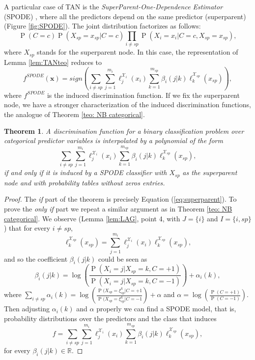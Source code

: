 \documentclass[11pt,a4paper, twoside]{book}
\newtheorem{theorem}{Theorem}[chapter]
\newcommand{\Pp}{\operatorname{P}}
\newcommand{\nchi}{\mathcal{X}}
\begin{document}
A particular case of TAN is the \textit{SuperParent-One-Dependence Estimator} (SPODE) \citep{keogh2002}, where all the predictors depend on the same predictor (superparent) (Figure \ref{fig:SPODE}). The joint distribution factorizes as follows:
\[ \Pp\left(C=c\right)\Pp\left(X_{sp}=x_{sp}|C=c\right)\prod_{i\neq sp} \Pp\left(X_i=x_i|C=c, X_{sp}=x_{sp}\right), \]
where $X_{sp}$ stands for the superparent node.
In this case, the representation of Lemma \ref{lem:TANteo} reduces to
\begin{equation}
\label{eq:superparent}
f^{SPODE}(\mathbf{x})= sign\left(  \sum_{i\neq sp} \sum_{j=1}^{m_i}\ell_j^{\nchi_i}(x_i) \sum_{k=1}^{m_{sp}} \beta_{i}(j|k) \ell_k^{\nchi_{sp}}(x_{sp})\right)   ,
\end{equation} 
where $f^{SPODE}$ is the induced discrimination function.
If we fix the superparent node, we have a stronger characterization of the induced discrimination functions, the analogue of Theorem \ref{teo: NB categorical}.
\begin{theorem}
\label{teo:SPODE}
A discrimination function for a binary classification problem over categorical predictor variables is interpolated by a polynomial of the form   \[\sum_{i\neq sp} \sum_{j=1}^{m_i}\ell_j^{\nchi_i}(x_i)\sum_{k=1}^{m_{sp}} \beta_{i}(j|k) \ell_k^{\nchi_{sp}}(x_{sp}),\] if and only if it is induced by a SPODE classifier with $X_{sp}$ as the superparent node { and  with probability tables without zeros entries}.
\end{theorem}
\begin{proof}
The \textit{if} part of the theorem is precisely Equation (\ref{eq:superparent}). To prove the \textit{only if} part we repeat a similar argument as in Theorem \ref{teo: NB categorical}.
We observe (Lemma \ref{lem:LAG}, point 4, with $J=\{i\}$ and $I=\{i,sp\}$) that for every $i\neq sp$,
\[ \ell_k^{\nchi_{sp}}(x_{sp})=\sum_{j=1}^{m_i} \ell_j^{\nchi_i}(x_i) \ell_k^{\nchi_{sp}}(x_{sp}), \] 
and so the coefficient $\beta_i(j|k)$ could be seen as 
\[ \beta_i(j|k)=\log\left( \frac{ \Pp( X_i=j|X_{sp}=k, C=+1)}{\Pp( X_i=j|X_{sp}=k, C=-1)} \right) + \alpha_i(k),  \]
where $ \sum_{i\neq sp} \alpha_{i}(k) = \log\left( \frac{\Pp(X_{sp}=\xi_{sp}^k|C=+1}{\Pp(X_{sp}=\xi_{sp}^k|C=-1} \right) + \alpha $ and $\alpha=\log\left( \frac{\Pp(C=+1)}{\Pp(C=-1)} \right)$.
Then adjusting $\alpha_i(k)$ and $\alpha$ properly we can find a SPODE model, that is, probability distributions over the predictors and the class that induces 
\[f=   \sum_{i\neq sp} \sum_{j=1}^{m_i}\ell_j^{\nchi_i}(x_i)\sum_{k=1}^{m_{sp}} \beta_{i}(j|k) \ell_k^{\nchi_{sp}}(x_{sp}) , \]
for every $\beta_i(j|k) \in \mathbb{R}$.
\end{proof}
\end{document}

